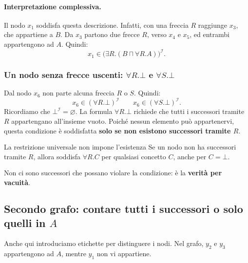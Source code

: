 \paragraph{Interpretazione complessiva.}


Il nodo \(x_1\) soddisfa questa descrizione. Infatti, con una freccia \(R\)
raggiunge \(x_3\), che appartiene a \(B\). Da \(x_3\) partono due frecce
\(R\), verso \(x_4\) e \(x_5\), ed entrambi appartengono ad \(A\). Quindi:
\[
    x_1\in\bigl(\exists R.(B\sqcap\forall R.A)\bigr)^{\mathcal I}.
\]


\subsubsection{Un nodo senza frecce uscenti: \(\forall R.\bot\) e \(\forall S.\bot\)}

Dal nodo \(x_6\) non parte alcuna freccia \(R\) o \(S\). Quindi:
\[
    x_6\in(\forall R.\bot)^{\mathcal I}
    \qquad
    x_6\in(\forall S.\bot)^{\mathcal I}.
\]
Ricordiamo che \(\bot^{\mathcal I}=\varnothing\). La formula \(\forall R.\bot\)
richiede che tutti i successori tramite \(R\) appartengano all'insieme vuoto.
Poiché nessun elemento può appartenervi, questa condizione è soddisfatta
\textbf{solo se non esistono successori tramite \(R\)}.

\begin{warning}{La restrizione universale non impone l'esistenza}
    Se un nodo non ha successori tramite \(R\), allora soddisfa \(\forall R.C\)
    per qualsiasi concetto \(C\), anche per \(C=\bot\).

    Non ci sono successori che possano violare la condizione: è la
    \textbf{verità per vacuità}.
\end{warning}

\newpage


\subsection{Secondo grafo: contare tutti i successori o solo quelli in \(A\)}

Anche qui introduciamo etichette per distinguere i nodi. Nel grafo, \(y_2\)
e \(y_3\) appartengono ad \(A\), mentre \(y_1\) non vi appartiene.

\begin{center}
\end{center}

